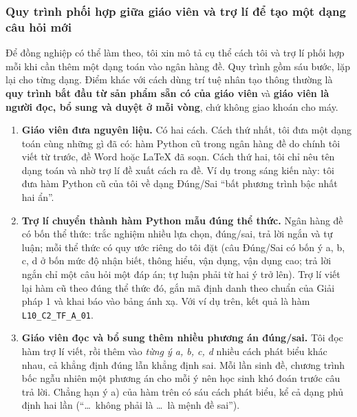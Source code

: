 \subsubsection{Quy trình phối hợp giữa giáo viên và trợ lí để tạo một dạng câu hỏi mới}

Để đồng nghiệp có thể làm theo, tôi xin mô tả cụ thể cách tôi và trợ lí phối
hợp mỗi khi cần thêm một dạng toán vào ngân hàng đề. Quy trình gồm sáu bước,
lặp lại cho từng dạng. Điểm khác với cách dùng trí tuệ nhân tạo thông thường là
\textbf{quy trình bắt đầu từ sản phẩm sẵn có của giáo viên} và \textbf{giáo
viên là người đọc, bổ sung và duyệt ở mỗi vòng}, chứ không giao khoán cho máy.

\begin{enumerate}[label=\textbf{Bước \arabic*.}, leftmargin=*, itemsep=6pt]
  \item \textbf{Giáo viên đưa nguyên liệu.} Có hai cách. Cách thứ nhất, tôi
  đưa một dạng toán cùng những gì đã có: hàm Python cũ trong ngân hàng đề do
  chính tôi viết từ trước, đề Word hoặc \LaTeX{} đã soạn. Cách thứ hai, tôi chỉ
  nêu tên dạng toán và nhờ trợ lí đề xuất cách ra đề. Ví dụ trong sáng kiến này:
  tôi đưa hàm Python cũ của tôi về dạng Đúng/Sai ``bất phương trình bậc nhất hai
  ẩn''.

  \item \textbf{Trợ lí chuyển thành hàm Python mẫu đúng thể thức.} Ngân hàng đề
  có bốn thể thức: trắc nghiệm nhiều lựa chọn, đúng/sai, trả lời ngắn và tự
  luận; mỗi thể thức có quy ước riêng do tôi đặt (câu Đúng/Sai có bốn ý a, b,
  c, d ở bốn mức độ nhận biết, thông hiểu, vận dụng, vận dụng cao; trả lời ngắn
  chỉ một câu hỏi một đáp án; tự luận phải từ hai ý trở lên). Trợ lí viết lại
  hàm cũ theo đúng thể thức đó, gắn mã định danh theo chuẩn của Giải pháp 1 và
  khai báo vào bảng ánh xạ. Với ví dụ trên, kết quả là hàm
  \texttt{L10\_C2\_TF\_A\_01}.

  \item \textbf{Giáo viên đọc và bổ sung thêm nhiều phương án đúng/sai.} Tôi
  đọc hàm trợ lí viết, rồi thêm vào \textit{từng ý a, b, c, d} nhiều cách phát
  biểu khác nhau, cả khẳng định đúng lẫn khẳng định sai. Mỗi lần sinh đề, chương
  trình bốc ngẫu nhiên một phương án cho mỗi ý nên học sinh khó đoán trước câu
  trả lời. Chẳng hạn ý a) của hàm trên có sáu cách phát biểu, kể cả dạng phủ
  định hai lần (``\dots\ không phải là \dots\ là mệnh đề sai'').


\end{enumerate}
